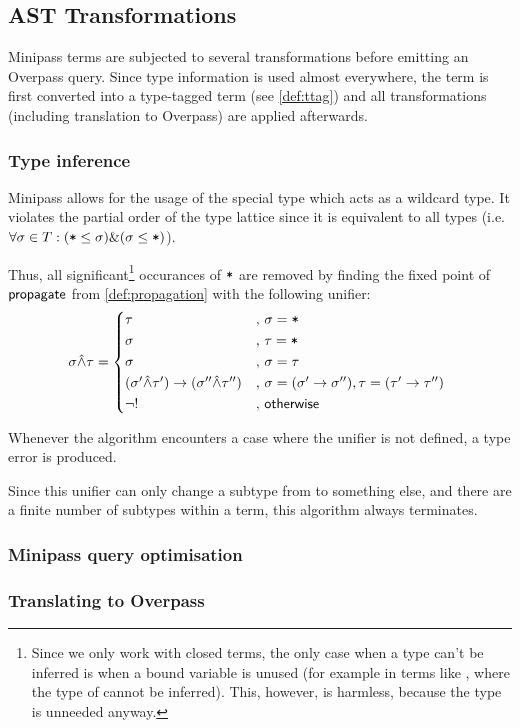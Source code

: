 \documentclass[main.tex]{subfiles}
\begin{document}
\subsection{AST Transformations}
Minipass terms are subjected to several transformations before emitting
an Overpass query. Since type information is used almost everywhere,
the term is first converted into a type-tagged term (see \cref{def:ttag})
and all transformations (including translation to Overpass) are applied
afterwards.

\subsubsection{Type inference}
\label{sec:typeinf}
Minipass allows for the usage of the special type \code{*} which acts as a
wildcard type. It violates the partial order of the type lattice since it is
equivalent to all types (i.e. $\forall \sigma \in T: (\text{\mbox{\texttt{*}}} \leq \sigma)
\& (\sigma \leq \text{\mbox{\texttt{*}}})$).

Thus, all significant\footnote{
    Since we only work with closed terms, the only case when a type can't be
    inferred is when a bound variable is unused (for example in terms like
    , where the type of  cannot be inferred).
    This, however, is harmless, because the type is unneeded anyway.
} occurances of $\mbox{\texttt{*}}$ are removed by finding the fixed point of
$\mathsf{propagate}$ from \cref{def:propagation}
with the following unifier:
\[
    \sigma \unify \tau =
    \begin{cases*}
        \tau& , $\sigma = \text{\code{*}}$ \\
        \sigma& , $\tau = \text{\code{*}}$ \\
        \sigma& , $\sigma = \tau$ \\
        (\sigma' \unify \tau') \tot (\sigma'' \unify \tau'')& ,
            $\sigma = (\sigma' \tot \sigma''), \tau = (\tau' \tot \tau'')$ \\
        \lnot !& , $\mathsf{otherwise}$ \\
    \end{cases*}
\]

Whenever the algorithm encounters a case where the unifier is not defined,
a type error is produced.

Since this unifier can only change a subtype from \code{*} to something else,
and there are a finite number of subtypes within a term, this algorithm
always terminates.

\subsubsection{Minipass query optimisation}

\subsubsection{Translating to Overpass}
\end{document}

